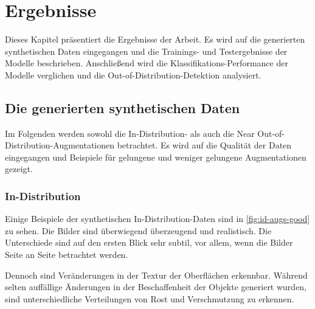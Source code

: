 \chapter{Ergebnisse} \label{ch:results}

Dieses Kapitel präsentiert die Ergebnisse der Arbeit. Es wird auf die generierten synthetischen Daten eingegangen und die Trainings- und Testergebnisse der Modelle beschrieben. Anschließend wird die Klassifikations-Performance der Modelle verglichen und die Out-of-Distribution-Detektion analysiert.

\section{Die generierten synthetischen Daten} \label{sec:da-fusion-results}

Im Folgenden werden sowohl die In-Distribution- als auch die Near Out-of-Distribution-Augmentationen betrachtet. Es wird auf die Qualität der Daten eingegangen und Beispiele für gelungene und weniger gelungene Augmentationen gezeigt.

\subsection{In-Distribution} \label{subsec:da-fusion-id-results}

Einige Beispiele der synthetischen In-Distribution-Daten sind in \autoref{fig:id-augs-good} zu sehen. Die Bilder sind überwiegend überzeugend und realistisch. Die Unterschiede sind auf den ersten Blick sehr subtil, vor allem, wenn die Bilder Seite an Seite betrachtet werden.

Dennoch sind Veränderungen in der Textur der Oberflächen erkennbar. Während selten auffällige Änderungen in der Beschaffenheit der Objekte generiert wurden, sind unterschiedliche Verteilungen von Rost und Verschmutzung zu erkennen.

